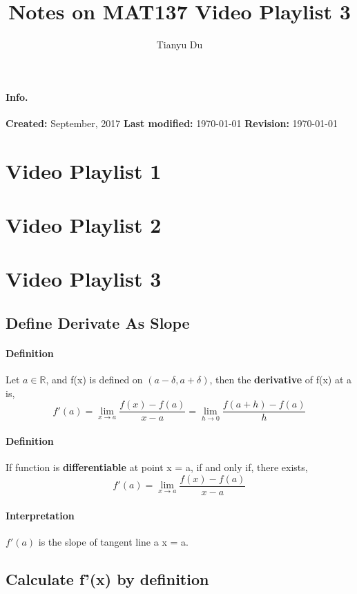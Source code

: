 \documentclass{article}
\author{Tianyu Du}
\title{Notes on MAT137 Video Playlist 3}
\begin{document}
	\maketitle
	\paragraph{Info.}\quad
	\newline \textbf{Created: } September, 2017
	\newline \textbf{Last modified: } \today
	\newline \textbf{Revision: } \currenttime \quad \today
	
	\doclicenseThis
	\tableofcontents
	
	\section{Video Playlist 1}
	\section{Video Playlist 2}
	
	\section{Video Playlist 3}
	\subsection{Define Derivate As Slope}
	\paragraph{Definition} Let $a \in \mathbb{R}$, and f(x) is defined on $(a - \delta , a + \delta )$, then the \textbf{derivative} of f(x) at a is,
	\[
		f'(a) = \lim_{x\to a}\frac{f(x) - f(a)}{x - a} = \lim_{h \to 0}\frac{f(a+h) - f(a)}{h}
	\]
	\paragraph{Definition} If function is \textbf{differentiable} at point x = a, if and only if, there exists,
	\[
		f'(a) = \lim_{x \to a} \frac{f(x) - f(a)}{x - a}
	\]
	\paragraph{Interpretation} $f'(a)$ is the slope of tangent line a x = a.
	\subsection{Calculate f'(x) by definition}
\end{document}

